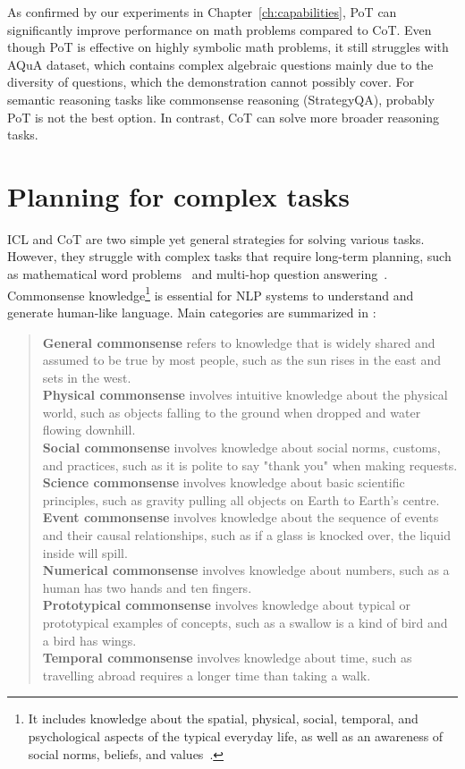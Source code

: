As confirmed by our experiments in Chapter~\ref{ch:capabilities}, PoT can significantly improve performance on math problems compared to CoT\@.
Even though PoT is effective on highly symbolic math problems, it still struggles with AQuA dataset, which contains complex algebraic questions mainly due to the diversity of questions, which the demonstration cannot possibly cover.
For semantic reasoning tasks like commonsense reasoning (StrategyQA), probably PoT is not the best option.
In contrast, CoT can solve more broader reasoning tasks.

\section{Planning for complex tasks}
\label{sec:planning}

ICL and CoT are two simple yet general strategies for solving various tasks.
However, they struggle with complex tasks that require long-term planning, such as mathematical word problems~\cite{qian2022limitations} and multi-hop question answering~\cite{bian2024chatgpt}.
Commonsense knowledge\footnote{It includes knowledge about the spatial, physical, social, temporal, and psychological aspects of the typical everyday life, as well as an awareness of social norms, beliefs, and values~\cite{liu2004conceptnet}.} is essential for NLP systems to understand and generate human-like language.
Main categories are summarized in \textcite{bian2024chatgpt}:
\begin{quote}
	\textbf{General commonsense} refers to knowledge that is widely shared and assumed to be true by most people, such as the sun rises in the east and sets in the west.\\
	\textbf{Physical commonsense} involves intuitive knowledge about the physical world, such as objects falling to the ground when dropped and water flowing downhill.\\
	\textbf{Social commonsense} involves knowledge about social norms, customs, and practices, such as it is polite to say "thank you" when
	making requests.\\
	\textbf{Science commonsense} involves knowledge about basic scientific principles, such as gravity pulling all objects on Earth to Earth’s centre.\\
	\textbf{Event commonsense} involves knowledge about the sequence of events and their causal relationships, such as if a glass is knocked over, the liquid inside will spill.\\
	\textbf{Numerical commonsense} involves knowledge about numbers, such as a human has two hands and ten fingers.\\
	\textbf{Prototypical commonsense} involves knowledge about typical or prototypical examples of concepts, such as a swallow is a kind of bird and a bird has wings.\\
	\textbf{Temporal commonsense} involves knowledge about time, such as travelling abroad requires a longer time than taking a walk.
\end{quote}
